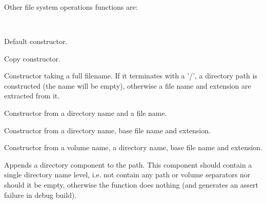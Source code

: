 \\
\\
\\

Other file system operations functions are:

\\



\label{wxfilenamewxfilename}


Default constructor.


Copy constructor.


Constructor taking a full filename. If it terminates with a '/', a directory path
is constructed (the name will be empty), otherwise a file name and
extension are extracted from it.


Constructor from a directory name and a file name.


Constructor from a directory name, base file name and extension.


Constructor from a volume name, a directory name, base file name and extension.


\label{wxfilenameappenddir}


Appends a directory component to the path. This component should contain a
single directory name level, i.e. not contain any path or volume separators nor
should it be empty, otherwise the function does nothing (and generates an
assert failure in debug build).


